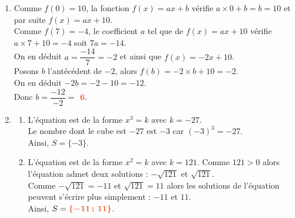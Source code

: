 \documentclass[a4paper,11pt]{article}
\begin{document}
{\begin{seanceD}{}
\begin{enumerate}
\item  Comme $f(0)=10$, la fonction $f(x)=ax+b$ vérifie $a\times 0 + b = b = 10$ et par suite $f(x)=ax+10$.\\Comme $f(7)=-4$, le coefficient $a$ tel que de $f(x)=ax+10$ vérifie $a\times 7+10 = -4$ soit $7a=-14$.\\On en déduit $a=\dfrac{-14}{7}=-2$ et ainsi que $f(x)=-2x+10$.\\Posons $b$ l'antécédent de $-2$, alors $f(b)=-2\times b+10=-2$.\\On en déduit $-2b=-2-10=-12$.\\Donc $b=\dfrac{-12}{-2}=$ ${\color[HTML]{f15929}\boldsymbol{6}}$.

\item \begin{enumerate}[itemsep=1em]
	\item L'équation est de la forme $x^3=k$ avec $k=-27$. \\
              Le nombre dont le cube est $-27$ est $-3$ car $(-3)^3=-27$.\\
              Ainsi,   $S=\{-3\}$.
              
	\item L'équation est de la forme $x^2=k$ avec $k=121$. Comme  $121>0$ alors l'équation admet deux solutions : $-\sqrt{121}$ et $\sqrt{121}$.\\
                Comme $-\sqrt{121}=-11$ et $\sqrt{121}=11$ alors
                les solutions de l'équation peuvent s'écrire plus simplement : $-11$ et $11$.\\
                Ainsi,  $S={\color[HTML]{f15929}\boldsymbol{\{-11\,;\,11\}}}$.
\end{enumerate}

\end{enumerate}

\end{seanceD}
}{}
\end{document}
